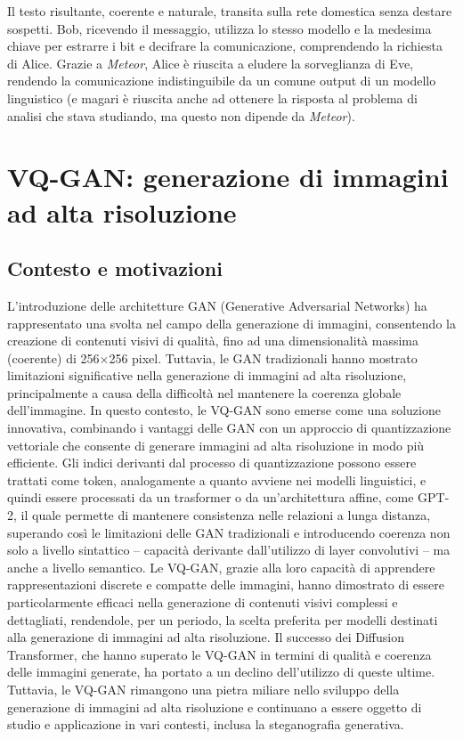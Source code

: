 Il testo risultante, coerente e naturale, transita sulla rete domestica senza destare sospetti. Bob, ricevendo il messaggio, utilizza lo stesso modello e la medesima chiave per estrarre i bit e decifrare la comunicazione, comprendendo la richiesta di Alice. Grazie a \emph{Meteor}, Alice è riuscita a eludere la sorveglianza di Eve, rendendo la comunicazione indistinguibile da un comune output di un modello linguistico (e magari è riuscita anche ad ottenere la risposta al problema di analisi che stava studiando, ma questo non dipende da \textit{Meteor}).


\section[VQ-GAN]{VQ-GAN: generazione di immagini ad alta risoluzione}
\label{sec:vqgan}

\subsection{Contesto e motivazioni}
L'introduzione delle architetture GAN (Generative Adversarial Networks) ha rappresentato una svolta nel campo della generazione di immagini, consentendo la creazione di contenuti visivi di qualità, fino ad una dimensionalità massima (coerente) di 256$\times$256 pixel. Tuttavia, le GAN tradizionali hanno mostrato limitazioni significative nella generazione di immagini ad alta risoluzione, principalmente a causa della difficoltà nel mantenere la coerenza globale dell'immagine. In questo contesto, le VQ-GAN sono emerse come una soluzione innovativa, combinando i vantaggi delle GAN con un approccio di quantizzazione vettoriale che consente di generare immagini ad alta risoluzione in modo più efficiente. Gli indici derivanti dal processo di quantizzazione possono essere trattati come token, analogamente a quanto avviene nei modelli linguistici, e quindi essere processati da un trasformer o da un'architettura affine, come GPT-2, il quale permette di mantenere consistenza nelle relazioni a lunga distanza, superando così le limitazioni delle GAN tradizionali e introducendo coerenza non solo a livello sintattico -- capacità derivante dall'utilizzo di layer convolutivi -- ma anche a livello semantico. Le VQ-GAN, grazie alla loro capacità di apprendere rappresentazioni discrete e compatte delle immagini, hanno dimostrato di essere particolarmente efficaci nella generazione di contenuti visivi complessi e dettagliati, rendendole, per un periodo, la scelta preferita per modelli destinati alla generazione di immagini ad alta risoluzione. Il successo dei Diffusion Transformer, che hanno superato le VQ-GAN in termini di qualità e coerenza delle immagini generate, ha portato a un declino dell'utilizzo di queste ultime. Tuttavia, le VQ-GAN rimangono una pietra miliare nello sviluppo della generazione di immagini ad alta risoluzione e continuano a essere oggetto di studio e applicazione in vari contesti, inclusa la steganografia generativa.

